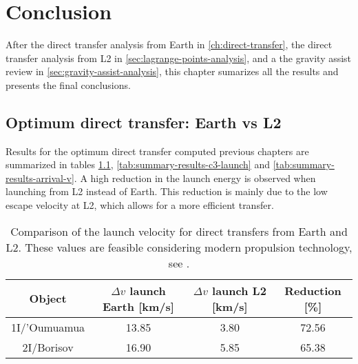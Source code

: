 \chapter{Conclusion}

After the direct transfer analysis from Earth in \ref{ch:direct-transfer}, the
direct transfer analysis from L2 in \ref{sec:lagrange-points-analysis}, and a
the gravity assist review in \ref{sec:gravity-assist-analysis}, this chapter
sumarizes all the results and presents the final conclusions.

\section{Optimum direct transfer: Earth vs L2}

Results for the optimum direct transfer computed previous chapters are
summarized in tables \ref{tab:summary-results-v-launch},
\ref{tab:summary-results-c3-launch} and \ref{tab:summary-results-arrival-v}. A
high reduction in the launch energy is observed when launching from L2 instead
of Earth. This reduction is mainly due to the low escape velocity at L2, which
allows for a more efficient transfer.

\vspace{1cm}
\begin{table}[H]
  \centering
  \begin{tabular}{|c|c|c|c|}
    \hline
    Object       & $\Delta v$ launch Earth [km/s] & $\Delta v$ launch L2 [km/s] & Reduction [\%] \\
    \hline
    1I/'Oumuamua & 13.85                           & 3.80 & 72.56          \\
    \hline
    2I/Borisov   & 16.90                            & 5.85
          & 65.38          \\
    \hline
  \end{tabular}
  \caption[Comparison of the launch velocity for direct transfers from Earth and
    L2.]{Comparison of the launch velocity for direct transfers from Earth and
        L2. These values are feasible considering modern propulsion technology,
        see \cite{longhurst2021}.}
  \label{tab:summary-results-v-launch}
\end{table}


